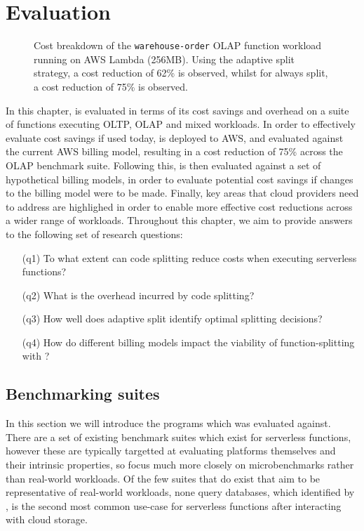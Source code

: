 \chapter{Evaluation}
\label{chap:eval}
\begin{figure}
    \begin{center}
        
    \end{center}
    \caption{Cost breakdown of the \texttt{warehouse-order} OLAP function workload running on AWS Lambda (256MB). Using the adaptive split strategy, a cost reduction of 62\% is observed, whilst for always split, a cost reduction of 75\% is observed.}
\end{figure}

In this chapter, \faaas{} is evaluated in terms of its cost savings and overhead on a suite of \faas{} functions executing OLTP, OLAP and mixed workloads. In order to effectively evaluate cost savings if used today, \faas{} is deployed to AWS, and evaluated against the current AWS billing model, resulting in a cost reduction of 75\% across the OLAP benchmark suite. Following this, \faaas{} is then evaluated against a set of hypothetical billing models, in order to evaluate potential cost savings if changes to the billing model were to be made. Finally, key areas that cloud providers need to address are highlighed in order to enable more effective cost reductions across a wider range of \faas{} workloads. Throughout this chapter, we aim to provide answers to the following set of research questions:

\begin{itemize}
    \item[(q1)] To what extent can code splitting reduce costs when executing serverless functions?
    \item[(q2)] What is the overhead incurred by code splitting?
    \item[(q3)] How well does adaptive split identify optimal splitting decisions?
    \item[(q4)] How do different \faas{} billing models impact the viability of function-splitting with \faaas{}?
\end{itemize}

\section{Benchmarking suites}
In this section we will introduce the programs which \faaas{} was evaluated against. There are a set of existing benchmark suites which exist for serverless functions, however these are typically targetted at evaluating \faas{} platforms themselves and their intrinsic properties, so focus much more closely on microbenchmarks rather than real-world workloads. Of the few suites that do exist that aim to be representative of real-world workloads, none query databases, which identified by \cite{eismannReviewServerlessUse2020}, is the second most common use-case for serverless functions after interacting with cloud storage.

